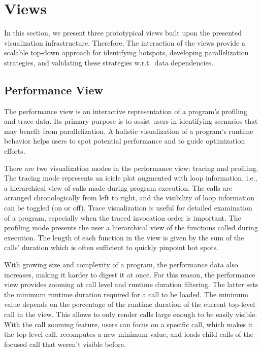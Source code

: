 \section{Views}
In this section, we present three prototypical views built upon the
presented visualization infrastructure. Therefore, The interaction of the views
provide a scalable top-down approach for identifying hotspots, developing
parallelization strategies, and validating these strategies w.r.t.~data
dependencies.

\subsection{Performance View}
\label{sec:performance_view}
The performance view is an interactive representation of a program's profiling
and trace data. Its primary purpose is to assist users in identifying scenarios
that may benefit from parallelization. A holistic visualization of a program's
runtime behavior helps users to spot potential performance and to guide
optimization efforts.

There are two visualization modes in the performance view: tracing and
profiling. The tracing mode represents an icicle plot augmented with loop
information, i.e., a hierarchical view of calls made during program execution.
The calls are arranged chronologically from left to right, and the visibility
of loop information can be toggled (on or off). Trace visualization is useful
for detailed examination of a program, especially when the traced invocation
order is important. The profiling mode presents the user a hierarchical view of
the functions called during execution. The length of each function in the view
is given by the sum of the calls' duration which is often sufficient to quickly
pinpoint hot spots.

With growing size and complexity of a program, the performance data also
increases, making it harder to digest it at once. For this reason, the
performance view provides zooming at call level and runtime duration filtering.
The latter sets the minimum runtime duration required for a call to be loaded.
The minimum value depends on the percentage of the runtime duration of the
current top-level call in the view. This allows to only render calls large
enough to be easily visible. With the call zooming feature, users can focus on
a specific call, which makes it the top-level call, recomputes a new minimum
value, and loads child calls of the focused call that weren't visible before.

